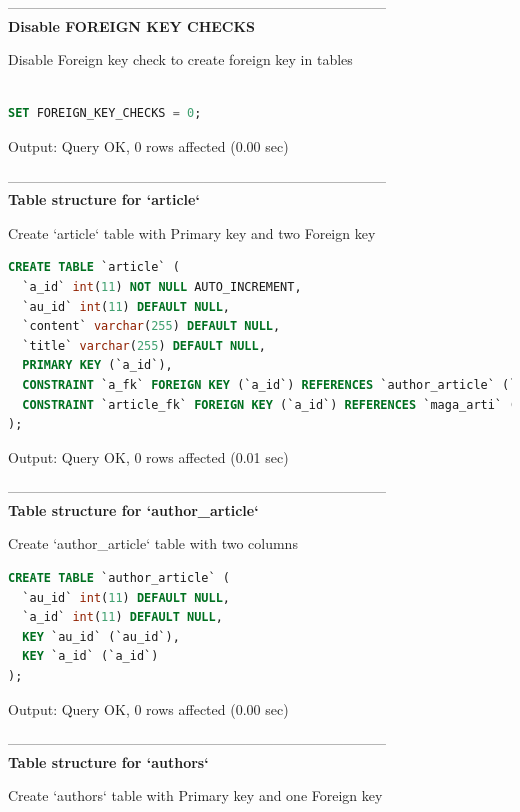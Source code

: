 \documentclass[12pt]{report}
\begin{document}
---------------------------------------------------------------------------------
\\
\textbf {Disable FOREIGN KEY CHECKS}

Disable Foreign key check to create foreign key in tables
 
\begin{lstlisting}[language=sql]

SET FOREIGN_KEY_CHECKS = 0;

\end{lstlisting}
Output: Query OK, 0 rows affected (0.00 sec)

---------------------------------------------------------------------------------\\


\textbf {Table structure for `article`}

Create `article` table with Primary key and two Foreign key 

\begin{lstlisting}[language=sql]
CREATE TABLE `article` (
  `a_id` int(11) NOT NULL AUTO_INCREMENT,
  `au_id` int(11) DEFAULT NULL,
  `content` varchar(255) DEFAULT NULL,
  `title` varchar(255) DEFAULT NULL,
  PRIMARY KEY (`a_id`),
  CONSTRAINT `a_fk` FOREIGN KEY (`a_id`) REFERENCES `author_article` (`a_id`) ON DELETE CASCADE ON UPDATE CASCADE,
  CONSTRAINT `article_fk` FOREIGN KEY (`a_id`) REFERENCES `maga_arti` (`a_id`) ON DELETE CASCADE ON UPDATE CASCADE
);
\end{lstlisting}
Output: Query OK, 0 rows affected (0.01 sec)

---------------------------------------------------------------------------------\\
\textbf {Table structure for `author\_article`}

Create `author\_article` table with two columns

\begin{lstlisting}[language=sql]
CREATE TABLE `author_article` (
  `au_id` int(11) DEFAULT NULL,
  `a_id` int(11) DEFAULT NULL,
  KEY `au_id` (`au_id`),
  KEY `a_id` (`a_id`)
);
\end{lstlisting}

Output: Query OK, 0 rows affected (0.00 sec)

---------------------------------------------------------------------------------\\
\textbf {Table structure for `authors`}

Create `authors` table with Primary key and one Foreign key 
\end{document}
